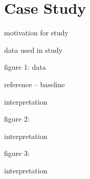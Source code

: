 
\section{Case Study}

motivation for study

data used in study

figure 1: data

reference -- baseline

interpretation

figure 2:

interpretation

figure 3:

interpretation
